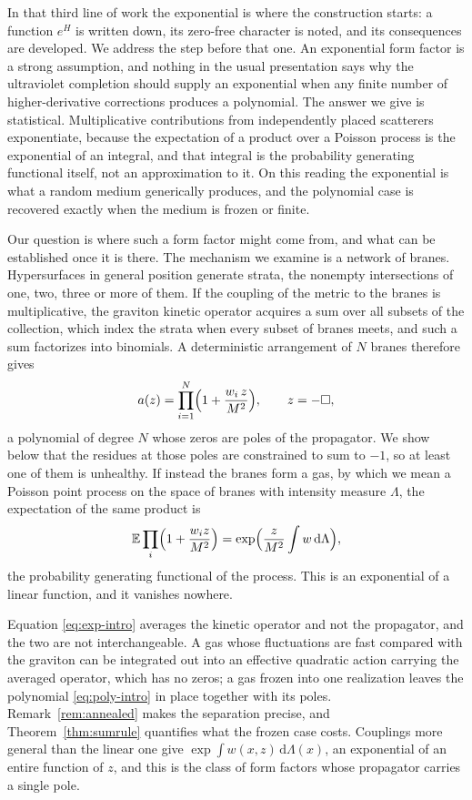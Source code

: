 \documentclass[aps,prd,10pt,twocolumn,superscriptaddress,nofootinbib,floatfix,longbibliography,showpacs,showkeys]{revtex4-2}
\theoremstyle{plain}
\theoremstyle{definition}
\theoremstyle{remark}
\newcommand{\bE}{\mathbb{E}}
\newcommand{\dd}{\mathrm{d}}
\begin{document}
In that third line of work the exponential is where the construction starts: a function $e^{H}$ is written down, its zero-free character is noted, and its consequences are developed. We address the step before that one. An exponential form factor is a strong assumption, and nothing in the usual presentation says why the ultraviolet completion should supply an exponential when any finite number of higher-derivative corrections produces a polynomial. The answer we give is statistical. Multiplicative contributions from independently placed scatterers exponentiate, because the expectation of a product over a Poisson process is the exponential of an integral, and that integral is the probability generating functional itself, not an approximation to it. On this reading the exponential is what a random medium generically produces, and the polynomial case is recovered exactly when the medium is frozen or finite.

Our question is where such a form factor might come from, and what can be established once it is there. The mechanism we examine is a network of branes. Hypersurfaces in general position generate strata, the nonempty intersections of one, two, three or more of them. If the coupling of the metric to the branes is multiplicative, the graviton kinetic operator acquires a sum over all subsets of the collection, which index the strata when every subset of branes meets, and such a sum factorizes into binomials. A deterministic arrangement of $N$ branes therefore gives
\begin{equation}
\label{eq:poly-intro}
a(z)=\prod_{i=1}^{N}\Bigl(1+\frac{w_i\,z}{M^2}\Bigr),\qquad z=-\Box,
\end{equation}
a polynomial of degree $N$ whose zeros are poles of the propagator. We show below that the residues at those poles are constrained to sum to $-1$, so at least one of them is unhealthy. If instead the branes form a gas, by which we mean a Poisson point process on the space of branes with intensity measure $\Lambda$, the expectation of the same product is
\begin{equation}
\label{eq:exp-intro}
\bE\prod_{i}\Bigl(1+\frac{w_i z}{M^2}\Bigr)=\exp\Bigl(\frac{z}{M^2}\int w\,\dd\Lambda\Bigr),
\end{equation}
the probability generating functional of the process. This is an exponential of a linear function, and it vanishes nowhere.

Equation \eqref{eq:exp-intro} averages the kinetic operator and not the propagator, and the two are not interchangeable. A gas whose fluctuations are fast compared with the graviton can be integrated out into an effective quadratic action carrying the averaged operator, which has no zeros; a gas frozen into one realization leaves the polynomial \eqref{eq:poly-intro} in place together with its poles. Remark~\ref{rem:annealed} makes the separation precise, and Theorem~\ref{thm:sumrule} quantifies what the frozen case costs. Couplings more general than the linear one give $\exp\int w(x,z)\,\dd\Lambda(x)$, an exponential of an entire function of $z$, and this is the class of form factors whose propagator carries a single pole.
\end{document}
